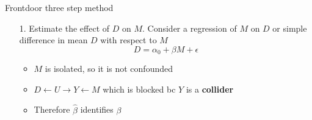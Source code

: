 \documentclass{beamer}
\begin{document}
\begin{frame}{Frontdoor three step method}

  \begin{center}
  \end{center}




  \begin{enumerate}
    \item[1. ] Estimate the effect of $D$ on $M$.  Consider a regression of $M$ on $D$ or simple difference in mean $D$ with respect to $M$ $$D = \alpha_0 + \beta M + \epsilon$$
          \begin{itemize}
            \item $M$ is isolated, so it is not confounded
            \item $D \leftarrow U \rightarrow Y \leftarrow M$ which is blocked bc $Y$ is a \textbf{collider}
            \item Therefore $\widehat{\beta}$ identifies $\beta$
          \end{itemize}
  \end{enumerate}

\end{frame}
\end{document}
